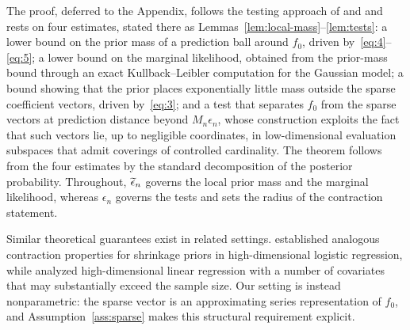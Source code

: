 The proof, deferred to the Appendix, follows the testing approach of \citet{Ghosal2000} and \citet{Ghosal2007} and rests on four estimates, stated there as Lemmas~\ref{lem:local-mass}--\ref{lem:tests}: a lower bound on the prior mass of a prediction ball around $f_0$, driven by~\eqref{eq:4}--\eqref{eq:5}; a lower bound on the marginal likelihood, obtained from the prior-mass bound through an exact Kullback--Leibler computation for the Gaussian model; a bound showing that the prior places exponentially little mass outside the sparse coefficient vectors, driven by~\eqref{eq:3}; and a test that separates $f_0$ from the sparse vectors at prediction distance beyond $M_n\epsilon_n$, whose construction exploits the fact that such vectors lie, up to negligible coordinates, in low-dimensional evaluation subspaces that admit coverings of controlled cardinality. The theorem follows from the four estimates by the standard decomposition of the posterior probability. Throughout, $\widetilde{\epsilon}_n$ governs the local prior mass and the marginal likelihood, whereas $\epsilon_n$ governs the tests and sets the radius of the contraction statement.

Similar theoretical guarantees exist in related settings. \citet{WeiGhosal2020} established analogous contraction properties for shrinkage priors in high-dimensional logistic regression, while \citet{SongLiang2023} analyzed high-dimensional linear regression with a number of covariates that may substantially exceed the sample size. Our setting is instead nonparametric: the sparse vector is an approximating series representation of $f_0$, and Assumption~\ref{ass:sparse} makes this structural requirement explicit.

